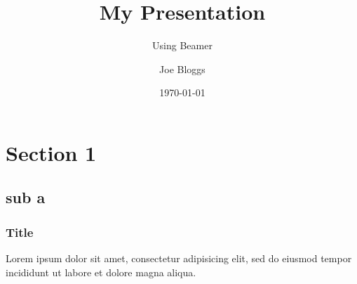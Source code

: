 \documentclass{beamer}
\title{My Presentation}
\subtitle{Using Beamer}
\author{Joe Bloggs}
\institute{University of ShareLaTeX}
\date{\today}
\begin{document}
\begin{frame}
\titlepage
\end{frame}

\section{Section 1}
\subsection{sub a}

\begin{frame}
\frametitle{Title}
Lorem ipsum dolor sit amet, consectetur adipisicing elit, sed do eiusmod tempor incididunt ut labore et dolore magna aliqua.
\end{frame}

\end{document}
